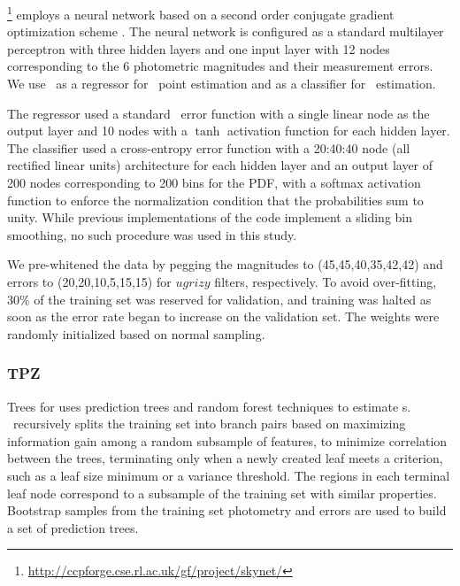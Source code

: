 \skynet \footnote{\url{http://ccpforge.cse.rl.ac.uk/gf/project/skynet/}} \citep{Graff:14} employs a neural network based on a second order conjugate gradient optimization scheme \citep[see][for further details]{Graff:14}. %
The neural network is configured as a standard multilayer perceptron with three hidden layers and one input layer with 12 nodes corresponding to the 6 photometric magnitudes and their measurement errors.
We use \skynet\ as a regressor for \pz\ point estimation and as a classifier for \pzpdf\ estimation.

The regressor used a standard \chisq\ error function with a single linear node as the output layer and 10 nodes with a $\tanh$ activation function for each hidden layer.
The classifier used a cross-entropy error function with a 20:40:40 node (all rectified linear units) architecture for each hidden layer and an output layer of 200 nodes corresponding to 200 bins for the PDF, with a softmax activation function to enforce the normalization condition that the probabilities sum to unity.
While previous implementations of the code \citep[see Appendix C.3 of~][]{Sanchez:14,Bonnett:15} implement a sliding bin smoothing, no such procedure was used in this study.

We pre-whitened the data by pegging the magnitudes to (45,45,40,35,42,42) and errors to (20,20,10,5,15,15) for $ugrizy$ filters, respectively.
To avoid over-fitting, $30\%$ of the training set was reserved for validation, and training was halted as soon as the error rate began to increase on the validation set.
The weights were randomly initialized based on normal sampling.

\subsubsection{TPZ}
\label{sec:tpz}

Trees for \Pz \citep[\tpz\footnote{\url{https://github.com/mgckind/MLZ}},][]{Carrasco_Kind:13,Carrascokind:14} uses prediction trees and random forest techniques to estimate \pzpdf s.
\tpz\ recursively splits the training set into branch pairs based on maximizing information gain among a random subsample of features, to minimize correlation between the trees, terminating only when a newly created leaf meets a criterion, such as a leaf size minimum or a variance threshold.
The regions in each terminal leaf node correspond to a subsample of the training set with similar properties.
Bootstrap samples from the training set photometry and errors are used to build a set of prediction trees.

